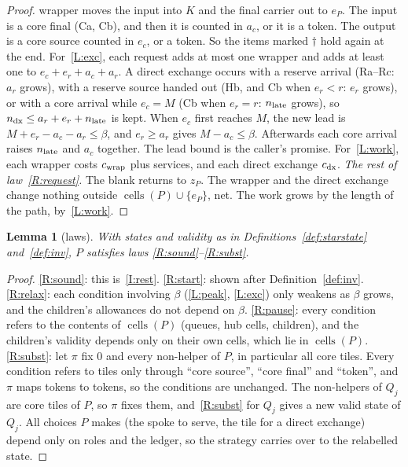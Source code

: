 \documentclass[11pt]{amsart}
\newtheorem{lemma}[theorem]{Lemma}
\theoremstyle{definition}
\newcommand{\cells}{\operatorname{cells}}
\begin{document}
\begin{proof}
wrapper moves the input into $K$ and the final carrier out to $e_P$. The input is a core final (Ca, Cb), and then it is counted in $a_c$, or
it is a token. The output is a core source counted in $e_c$, or a token. So the items marked $\dagger$ hold again at the end. For~\ref{L:exc},
each request adds at most one wrapper and adds at least one to $e_c+e_r+a_c+a_r$. A direct exchange occurs with a reserve arrival (Ra--Rc: $a_r$ grows), with a
reserve source handed out (Hb, and Cb when $e_r<r$: $e_r$ grows), or with a core arrival while $e_c=M$ (Cb when $e_r=r$: $n_{\rm late}$ grows), so
$n_{\rm dx}\le a_r+e_r+n_{\rm late}$ is kept. When $e_c$ first reaches $M$, the new lead is $M+e_r-a_c-a_r\le\beta$, and $e_r\ge a_r$ gives $M-a_c\le\beta$.
Afterwards each core arrival raises $n_{\rm late}$ and $a_c$ together. The lead bound is the caller's promise. For~\ref{L:work}, each wrapper costs
$c_{\rm wrap}$ plus services, and each direct exchange $c_{\rm dx}$.
\emph{The rest of law~\ref{R:request}.} The blank returns to $z_P$. The wrapper and the direct exchange change nothing outside
$\cells(P)\cup\{e_P\}$, net. The work grows by the length of the path, by~\ref{L:work}.
\end{proof}

\begin{lemma}[laws]\label{lem:starlaws}
With states and validity as in Definitions~\ref{def:starstate} and~\ref{def:inv}, $P$ satisfies laws \ref{R:sound}--\ref{R:subst}.
\end{lemma}

\begin{proof}
\ref{R:sound}: this is~\ref{I:rest}. \ref{R:start}: shown after Definition~\ref{def:inv}. \ref{R:relax}: each condition involving $\beta$ (\ref{L:peak}, \ref{L:exc})
only weakens as $\beta$ grows, and the children's allowances do not depend on $\beta$. \ref{R:pause}: every condition refers to the contents
of $\cells(P)$ (queues, hub cells, children), and the children's validity depends only on their own cells, which lie in $\cells(P)$.
\ref{R:subst}: let $\pi$ fix $0$ and every non-helper of $P$, in particular all core tiles. Every condition refers to tiles only through
``core source'', ``core final'' and ``token'', and $\pi$ maps tokens to tokens, so the conditions are unchanged. The non-helpers of $Q_j$ are
core tiles of $P$, so $\pi$ fixes them, and~\ref{R:subst} for $Q_j$ gives a new valid state of $Q_j$. All choices $P$ makes (the spoke to
serve, the tile for a direct exchange) depend only on roles and the ledger, so the strategy carries over to the relabelled state.
\end{proof}
\end{document}
